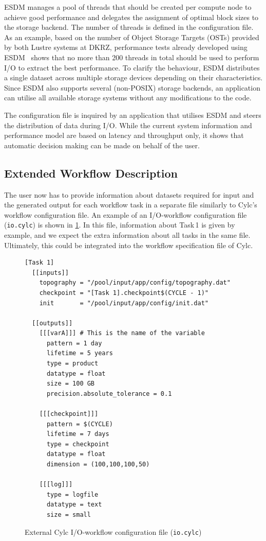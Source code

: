 \documentclass{superfri}
\begin{document}
ESDM manages a pool of threads that should be created per compute node to achieve good performance and delegates the assignment of optimal block sizes to the storage backend.
The number of threads is defined in the configuration file.
As an example, based on the number of Object Storage Targets (OSTs) provided by both Lustre systems at DKRZ, performance tests already developed using ESDM~\cite{2019_3361225} shows that no more than 200 threads in total should be used to perform I/O to extract the best performance.
To clarify the behaviour, ESDM distributes a single dataset across multiple storage devices depending on their characteristics.
Since ESDM also supports several (non-POSIX) storage backends, an application can utilise all available storage systems without any modifications to the code.

The configuration file is inquired by an application that utilises ESDM and steers the distribution of data during I/O.
While the current system information and performance model are based on latency and throughput only, it shows that automatic decision making can be made on behalf of the user.

\subsection{Extended Workflow Description}

The user now has to provide information about datasets required for input and the generated output for each workflow task in a separate file similarly to Cylc's workflow configuration file.
An example of an I/O-workflow configuration file (\texttt{io.cylc}) is shown in \cref{lst:cylc}. In this file, information about Task\,1 is given by example, and we expect the extra information about all tasks in the same file. Ultimately, this could be integrated into the workflow specification file of Cylc.

\begin{figure}[!ht]

\begin{lstlisting}
[Task 1]
  [[inputs]]
    topography = "/pool/input/app/config/topography.dat"
    checkpoint = "[Task 1].checkpoint$(CYCLE - 1)"
    init       = "/pool/input/app/config/init.dat"

  [[outputs]]
    [[[varA]]] # This is the name of the variable
      pattern = 1 day
      lifetime = 5 years
      type = product
      datatype = float
      size = 100 GB
      precision.absolute_tolerance = 0.1

    [[[checkpoint]]]
      pattern = $(CYCLE)
      lifetime = 7 days
      type = checkpoint
      datatype = float
      dimension = (100,100,100,50)

    [[[log]]]
      type = logfile
      datatype = text
      size = small
\end{lstlisting}

\caption{External Cylc I/O-workflow configuration file (\texttt{io.cylc})}
\label{lst:cylc}
\end{figure}
\end{document}

